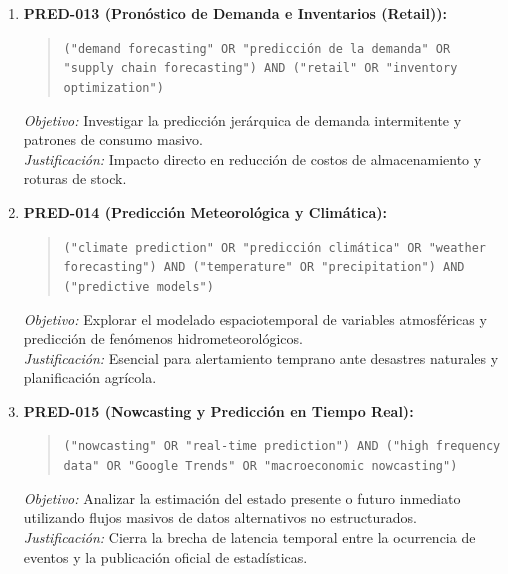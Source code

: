 \begin{enumerate}
  \item \textbf{PRED-013 (Pronóstico de Demanda e Inventarios (Retail)):}
  \begin{quote}
  \texttt{("demand forecasting" OR "predicción de la demanda" OR "supply chain forecasting") AND ("retail" OR "inventory optimization")}
  \end{quote}
  \textit{Objetivo:} Investigar la predicción jerárquica de demanda intermitente y patrones de consumo masivo.\\
  \textit{Justificación:} Impacto directo en reducción de costos de almacenamiento y roturas de stock.
  \item \textbf{PRED-014 (Predicción Meteorológica y Climática):}
  \begin{quote}
  \texttt{("climate prediction" OR "predicción climática" OR "weather forecasting") AND ("temperature" OR "precipitation") AND ("predictive models")}
  \end{quote}
  \textit{Objetivo:} Explorar el modelado espaciotemporal de variables atmosféricas y predicción de fenómenos hidrometeorológicos.\\
  \textit{Justificación:} Esencial para alertamiento temprano ante desastres naturales y planificación agrícola.
  \item \textbf{PRED-015 (Nowcasting y Predicción en Tiempo Real):}
  \begin{quote}
  \texttt{("nowcasting" OR "real-time prediction") AND ("high frequency data" OR "Google Trends" OR "macroeconomic nowcasting")}
  \end{quote}
  \textit{Objetivo:} Analizar la estimación del estado presente o futuro inmediato utilizando flujos masivos de datos alternativos no estructurados.\\
  \textit{Justificación:} Cierra la brecha de latencia temporal entre la ocurrencia de eventos y la publicación oficial de estadísticas.
\end{enumerate}


